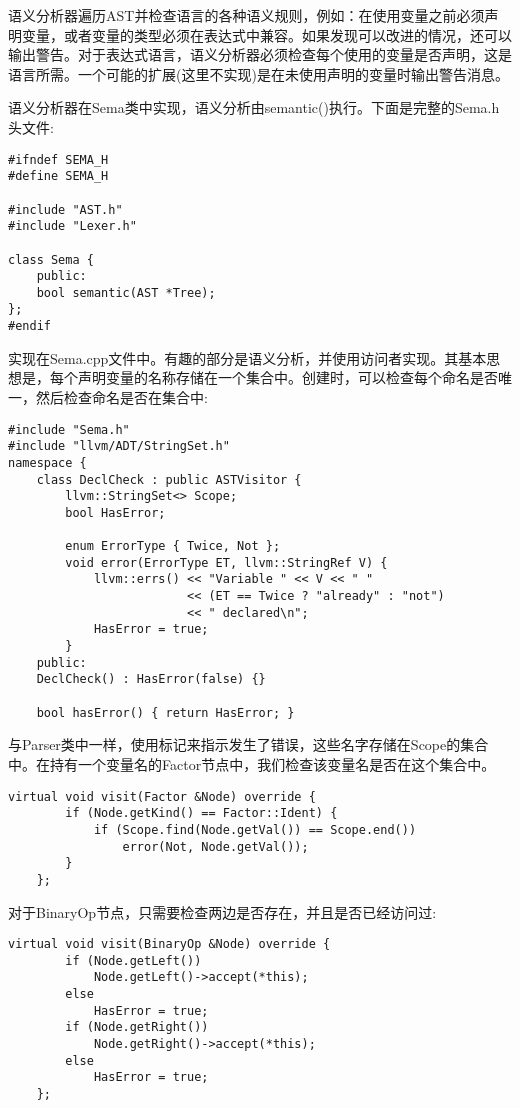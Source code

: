 语义分析器遍历AST并检查语言的各种语义规则，例如：在使用变量之前必须声明变量，或者变量的类型必须在表达式中兼容。如果发现可以改进的情况，还可以输出警告。对于表达式语言，语义分析器必须检查每个使用的变量是否声明，这是语言所需。一个可能的扩展(这里不实现)是在未使用声明的变量时输出警告消息。\par

语义分析器在Sema类中实现，语义分析由semantic()执行。下面是完整的Sema.h头文件:\par

\begin{lstlisting}[caption={}]
#ifndef SEMA_H
#define SEMA_H

#include "AST.h"
#include "Lexer.h"

class Sema {
	public:
	bool semantic(AST *Tree);
};
#endif
\end{lstlisting}

实现在Sema.cpp文件中。有趣的部分是语义分析，并使用访问者实现。其基本思想是，每个声明变量的名称存储在一个集合中。创建时，可以检查每个命名是否唯一，然后检查命名是否在集合中:

\begin{lstlisting}[caption={}]
#include "Sema.h"
#include "llvm/ADT/StringSet.h"
namespace {
	class DeclCheck : public ASTVisitor {
		llvm::StringSet<> Scope;
		bool HasError;
		
		enum ErrorType { Twice, Not };
		void error(ErrorType ET, llvm::StringRef V) {
			llvm::errs() << "Variable " << V << " "
						 << (ET == Twice ? "already" : "not")
						 << " declared\n";
			HasError = true;
		}
	public:
	DeclCheck() : HasError(false) {}
	
	bool hasError() { return HasError; }
\end{lstlisting}

与Parser类中一样，使用标记来指示发生了错误，这些名字存储在Scope的集合中。在持有一个变量名的Factor节点中，我们检查该变量名是否在这个集合中。

\begin{lstlisting}[caption={}]
	virtual void visit(Factor &Node) override {
		if (Node.getKind() == Factor::Ident) {
			if (Scope.find(Node.getVal()) == Scope.end())
				error(Not, Node.getVal());
		}
	};
\end{lstlisting}

对于BinaryOp节点，只需要检查两边是否存在，并且是否已经访问过:

\begin{lstlisting}[caption={}]
	virtual void visit(BinaryOp &Node) override {
		if (Node.getLeft())
			Node.getLeft()->accept(*this);
		else
			HasError = true;
		if (Node.getRight())
			Node.getRight()->accept(*this);
		else
			HasError = true;
	};
\end{lstlisting}

